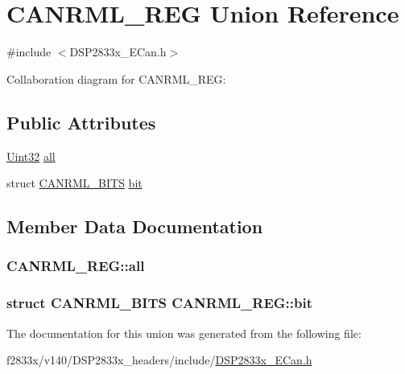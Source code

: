 \hypertarget{union_c_a_n_r_m_l___r_e_g}{}\section{C\+A\+N\+R\+M\+L\+\_\+\+R\+E\+G Union Reference}
\label{union_c_a_n_r_m_l___r_e_g}


{\ttfamily \#include $<$D\+S\+P2833x\+\_\+\+E\+Can.\+h$>$}



Collaboration diagram for C\+A\+N\+R\+M\+L\+\_\+\+R\+E\+G\+:
\subsection*{Public Attributes}
\begin{DoxyCompactItemize}
\item 
\hyperlink{_d_s_p2833x___device_8h_aba99025e657f892beb7ff31cecf64653}{Uint32} \hyperlink{union_c_a_n_r_m_l___r_e_g_aa7fc48b8d5aeecf8df908ae69ab3d413}{all}
\item 
struct \hyperlink{struct_c_a_n_r_m_l___b_i_t_s}{C\+A\+N\+R\+M\+L\+\_\+\+B\+I\+T\+S} \hyperlink{union_c_a_n_r_m_l___r_e_g_a65ff397972be2b31b9c9099a830a5f6f}{bit}
\end{DoxyCompactItemize}


\subsection{Member Data Documentation}
\hypertarget{union_c_a_n_r_m_l___r_e_g_aa7fc48b8d5aeecf8df908ae69ab3d413}{}
\subsubsection[{all}]{ C\+A\+N\+R\+M\+L\+\_\+\+R\+E\+G\+::all}\label{union_c_a_n_r_m_l___r_e_g_aa7fc48b8d5aeecf8df908ae69ab3d413}
\hypertarget{union_c_a_n_r_m_l___r_e_g_a65ff397972be2b31b9c9099a830a5f6f}{}
\subsubsection[{bit}]{\setlength{\rightskip}{0pt plus 5cm}struct {\bf C\+A\+N\+R\+M\+L\+\_\+\+B\+I\+T\+S} C\+A\+N\+R\+M\+L\+\_\+\+R\+E\+G\+::bit}\label{union_c_a_n_r_m_l___r_e_g_a65ff397972be2b31b9c9099a830a5f6f}


The documentation for this union was generated from the following file\+:\begin{DoxyCompactItemize}
\item 
f2833x/v140/\+D\+S\+P2833x\+\_\+headers/include/\hyperlink{_d_s_p2833x___e_can_8h}{D\+S\+P2833x\+\_\+\+E\+Can.\+h}\end{DoxyCompactItemize}
